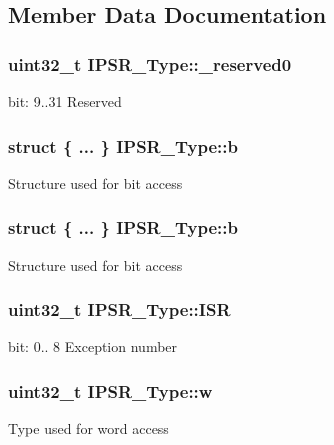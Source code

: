 \subsection{Member Data Documentation}
\hypertarget{union_i_p_s_r___type_ad2eb0a06de4f03f58874a727716aa9aa}{
\subsubsection[{\-\_\-reserved0}]{\setlength{\rightskip}{0pt plus 5cm}uint32\-\_\-t I\-P\-S\-R\-\_\-\-Type\-::\-\_\-reserved0}}\label{union_i_p_s_r___type_ad2eb0a06de4f03f58874a727716aa9aa}
bit\-: 9..31 Reserved \hypertarget{union_i_p_s_r___type_af8ce11ada7a21e0b119a0f48cb824ce2}{
\subsubsection[{b}]{\setlength{\rightskip}{0pt plus 5cm}struct \{ ... \}   I\-P\-S\-R\-\_\-\-Type\-::b}}\label{union_i_p_s_r___type_af8ce11ada7a21e0b119a0f48cb824ce2}
Structure used for bit access \hypertarget{union_i_p_s_r___type_a8694433a871ae74beeb7aa9abeea37bb}{
\subsubsection[{b}]{\setlength{\rightskip}{0pt plus 5cm}struct \{ ... \}   I\-P\-S\-R\-\_\-\-Type\-::b}}\label{union_i_p_s_r___type_a8694433a871ae74beeb7aa9abeea37bb}
Structure used for bit access \hypertarget{union_i_p_s_r___type_ab46e5f1b2f4d17cfb9aca4fffcbb2fa5}{
\subsubsection[{I\-S\-R}]{\setlength{\rightskip}{0pt plus 5cm}uint32\-\_\-t I\-P\-S\-R\-\_\-\-Type\-::\-I\-S\-R}}\label{union_i_p_s_r___type_ab46e5f1b2f4d17cfb9aca4fffcbb2fa5}
bit\-: 0.. 8 Exception number \hypertarget{union_i_p_s_r___type_a4adca999d3a0bc1ae682d73ea7cfa879}{
\subsubsection[{w}]{\setlength{\rightskip}{0pt plus 5cm}uint32\-\_\-t I\-P\-S\-R\-\_\-\-Type\-::w}}\label{union_i_p_s_r___type_a4adca999d3a0bc1ae682d73ea7cfa879}
Type used for word access 

